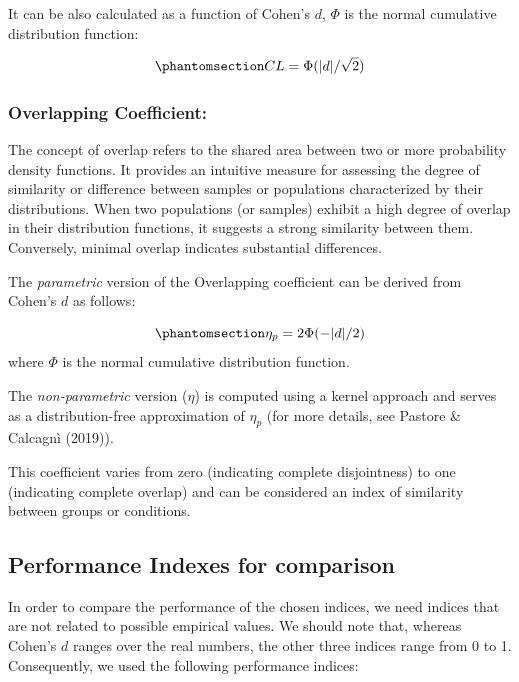 \documentclass[
  12pt,
  a4paper,
  DIV=11,
  numbers=noendperiod]{scrartcl}
\begin{document}
It can be also calculated as a function of Cohen's \(d\), \(\Phi\) is
the normal cumulative distribution function:

\begin{equation}\phantomsection\label{eq-CL}{
CL = \Phi(|d|/\sqrt{2})
}\end{equation}

\subsubsection{Overlapping Coefficient:}\label{overlapping-coefficient}

The concept of overlap refers to the shared area between two or more
probability density functions. It provides an intuitive measure for
assessing the degree of similarity or difference between samples or
populations characterized by their distributions. When two populations
(or samples) exhibit a high degree of overlap in their distribution
functions, it suggests a strong similarity between them. Conversely,
minimal overlap indicates substantial differences.

The \emph{parametric} version of the Overlapping coefficient can be
derived from Cohen's \(d\) as follows:

\begin{equation}\phantomsection\label{eq-OV}{
\eta_p = 2\Phi(-|d|/2)
}\end{equation} where \(\Phi\) is the normal cumulative distribution
function.

The \emph{non-parametric} version (\(\eta\)) is computed using a kernel
approach and serves as a distribution-free approximation of \(\eta_p\)
(for more details, see Pastore \& Calcagnì (2019)).

This coefficient varies from zero (indicating complete disjointness) to
one (indicating complete overlap) and can be considered an index of
similarity between groups or conditions.

\subsection{Performance Indexes for
comparison}\label{performance-indexes-for-comparison}

In order to compare the performance of the chosen indices, we need
indices that are not related to possible empirical values. We should
note that, whereas Cohen's \(d\) ranges over the real numbers, the other
three indices range from 0 to 1. Consequently, we used the following
performance indices:
\end{document}
